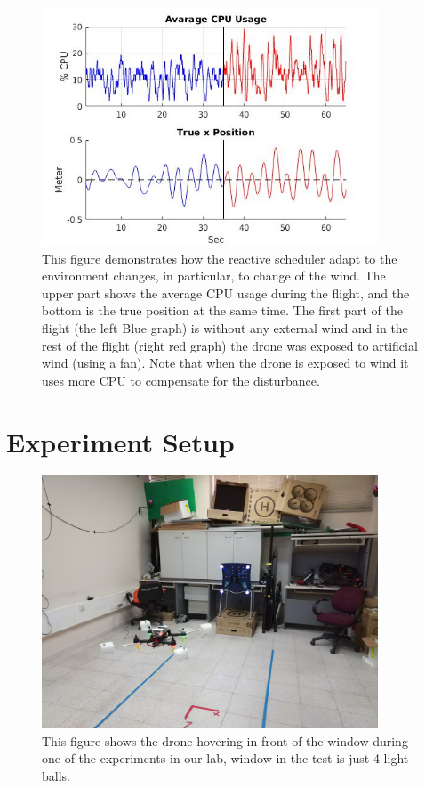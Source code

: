 \documentclass[ twoside, 12pt ]{article}
\begin{document}
\begin{figure} %
    \centerline{\includegraphics[width=100mm]{windPlot15.jpg}}
    \caption{This figure demonstrates how the reactive scheduler adapt to the environment changes, in particular, to change of the wind. The upper part shows the average CPU usage during the flight, and the bottom is the true position at the same time. The first part of the flight (the left Blue graph) is without any external wind and in the rest of the flight (right red graph)  the drone was exposed to artificial wind (using a fan). Note that when the drone is exposed to wind it uses more CPU to compensate for the disturbance.}
    \label{fig:windPlot}
\end{figure}

\section{Experiment Setup}
\label{sec:Experiment setup}

\begin{figure} %
    \centerline{\includegraphics[width=100mm]{hover_in_lab.jpg}}
    \caption{This figure shows the drone hovering in front of the window during one of the experiments in our lab, window in the test is just 4 light balls.}
    \label{fig:hover_in_lab}
\end{figure}
\end{document}
